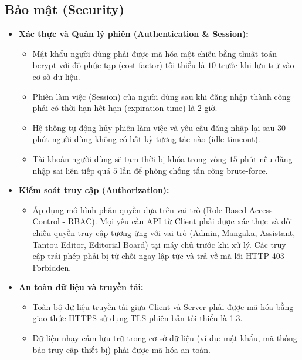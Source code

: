 \subsection{Bảo mật (Security)}
\label{subsec:nfr_security}
\begin{itemize}
    \item \textbf{Xác thực và Quản lý phiên (Authentication \& Session):}
    \begin{itemize}
        \item Mật khẩu người dùng phải được mã hóa một chiều bằng thuật toán bcrypt với độ phức tạp (cost factor) tối thiểu là $10$ trước khi lưu trữ vào cơ sở dữ liệu.
        \item Phiên làm việc (Session) của người dùng sau khi đăng nhập thành công phải có thời hạn hết hạn (expiration time) là $2$ giờ.
        \item Hệ thống tự động hủy phiên làm việc và yêu cầu đăng nhập lại sau $30$ phút người dùng không có bất kỳ tương tác nào (idle timeout).
        \item Tài khoản người dùng sẽ tạm thời bị khóa trong vòng $15$ phút nếu đăng nhập sai liên tiếp quá $5$ lần để phòng chống tấn công brute-force.
    \end{itemize}
    \item \textbf{Kiểm soát truy cập (Authorization):}
    \begin{itemize}
        \item Áp dụng mô hình phân quyền dựa trên vai trò (Role-Based Access Control - RBAC). Mọi yêu cầu API từ Client phải được xác thực và đối chiếu quyền truy cập tương ứng với vai trò (Admin, Mangaka, Assistant, Tantou Editor, Editorial Board) tại máy chủ trước khi xử lý. Các truy cập trái phép phải bị từ chối ngay lập tức và trả về mã lỗi HTTP 403 Forbidden.
    \end{itemize}
    \item \textbf{An toàn dữ liệu và truyền tải:}
    \begin{itemize}
        \item Toàn bộ dữ liệu truyền tải giữa Client và Server phải được mã hóa bằng giao thức HTTPS sử dụng TLS phiên bản tối thiểu là 1.3.
        \item Dữ liệu nhạy cảm lưu trữ trong cơ sở dữ liệu (ví dụ: mật khẩu, mã thông báo truy cập thiết bị) phải được mã hóa an toàn.
    \end{itemize}
\end{itemize}

